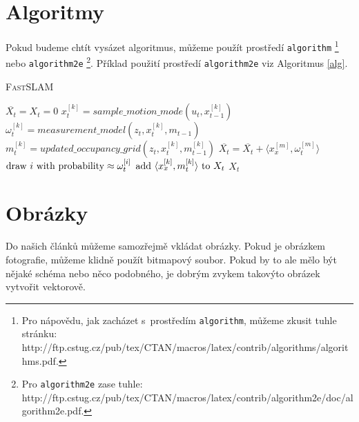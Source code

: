 \documentclass[11pt, a4paper]{article}
\begin{document}
\section{Algoritmy} \label{sec:Al}
Pokud budeme chtít vysázet algoritmus, můžeme použít prostředí \verb|algorithm|
\footnote{Pro nápovědu, jak zacházet s~prostředím \texttt{algorithm}, můžeme zkusit tuhle stránku: \\ http://ftp.cstug.cz/pub/tex/CTAN/macros/latex/contrib/algorithms/algorithms.pdf.}
 nebo \verb|algorithm2e|
\footnote{Pro \texttt{algorithm2e} zase tuhle: http://ftp.cstug.cz/pub/tex/CTAN/macros/latex/contrib/algorithm2e/doc/algorithm2e.pdf.}.
 Příklad použití prostředí \verb|algorithm2e| viz Algoritmus \ref{alg}.

\begin{algorithm}[h]
\caption{\textsc{Fast}SLAM} \label{alg}


\SetNlSty{}{}{:  } %
\SetInd{1em}{1em}
\SetNlSkip{-1.33em}

	\begin{algorithmic}[1]
		\STATE $\overline{X_t} = X_t = 0$
		\STATE $x^{[k]}_{t} = sample\_motion\_mode(u_t ,x^{[k]}_{t-1})$
		\STATE $\omega^{[k]}_{t} = measurement\_model(z_t ,x^{[k]}_{t}, m_{t-1})$
		\STATE $m^{[k]}_{t} = updated\_occupancy\_grid(z_t ,x^{[k]}_{t}, m_{t-1}^{[k]})$
		\STATE $\overline{X_t} = \overline{X_t} + \langle x^{[m]}_{x}, \omega^{[m]}_{t} \rangle$
		\ENDFOR
		\STATE $\textnormal{draw } i \textnormal{ with probability} \approx \omega^{[i]}_{t}$
		\STATE $\textnormal{add } \langle x^{[k]}_{x}, m^{[k]}_{t} \rangle \textnormal{ to } X_t$
		\ENDFOR
		\RETURN $X_t$
	\end{algorithmic}
\end{algorithm}

\section{Obrázky}
Do našich článků můžeme samozřejmě vkládat obrázky. Pokud je obrázkem fotografie, můžeme klidně použít bitmapový soubor. Pokud by to ale mělo být nějaké schéma nebo něco podobného, je dobrým zvykem takovýto obrázek vytvořit vektorově.
\end{document}
